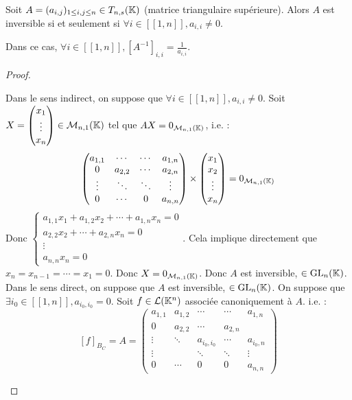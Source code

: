 \documentclass[12pt,a4paper]{report}
\begin{document}
\begin{property}
    Soit $A = (a_{i,j})_{1 \le i,j \le n} \in T_{n,s}(\mathbb{K})$ (matrice triangulaire supérieure). Alors $A$ est inversible si et seulement si $\forall i \in [\![1,n]\!], a_{i,i} \ne 0$.

    Dans ce cas, $\forall i \in [\![1,n]\!], [A^{-1}]_{i,i} = \frac{1}{a_{i,i}}$.
\end{property}

\begin{proof}
    \begin{outline}
        \1[$\impliedby$] Dans le sens indirect, on suppose que $\forall i \in [\![1,n]\!], a_{i,i} \ne 0$.
        \2 Soit $X = \left(\begin{matrix} x_1 \\ \vdots \\ x_n \end{matrix}\right) \in \mathcal M_{n,1}(\mathbb{K})$ tel que $AX = 0_{\mathcal M_{n,1}(\mathbb{K})}$, i.e. :
        $$\left(\begin{matrix} a_{1,1} & \cdots & \cdots & a_{1,n} \\ 0 & a_{2,2} & \cdots & a_{2,n} \\ \vdots & \ddots & \ddots & \vdots \\ 0 & \cdots & 0 & a_{n,n} \end{matrix}\right) \times \left(\begin{matrix} x_1 \\ x_2 \\ \vdots \\ x_n \end{matrix}\right) = 0_{\mathcal M_{n,1}(\mathbb{K})}$$
        \2 Donc $\begin{cases} a_{1,1} x_1 + a_{1,2} x_2 + \cdots + a_{1,n} x_n = 0 \\ a_{2,2} x_2 + \cdots + a_{2,n} x_n = 0 \\ \vdots \\ a_{n,n} x_n = 0 \end{cases}$.
        \2 Cela implique directement que $x_n = x_{n-1} = \cdots = x_1 = 0$.
        \2 Donc $X = 0_{\mathcal M_{n,1}(\mathbb{K})}$.
        \2 Donc $A$ est inversible, $\in \mathrm{GL}_n(\mathbb{K})$.
        \1[$\implies$] Dans le sens direct, on suppose que $A$ est inversible, $\in \mathrm{GL}_n(\mathbb{K})$.
        \2 On suppose que $\exists i_0 \in [\![1,n]\!], a_{i_0,i_0} = 0$.
        \2 Soit $f \in \mathcal L(\mathbb{K}^n)$ associée canoniquement à $A$. i.e. :
        $$[f]_{B_C} = A = \left(\begin{matrix} a_{1,1} & a_{1,2} & \cdots & \cdots & a_{1,n} \\ 0 & a_{2,2} & \cdots & a_{2,n} \\ \vdots & \ddots & a_{i_0,i_0} & \cdots & a_{i_0,n} \\ \vdots & & \ddots & \ddots & \vdots \\ 0 & \cdots & 0 & 0 & a_{n,n} \end{matrix}\right)$$

\end{outline}
\end{proof}
\end{document}

